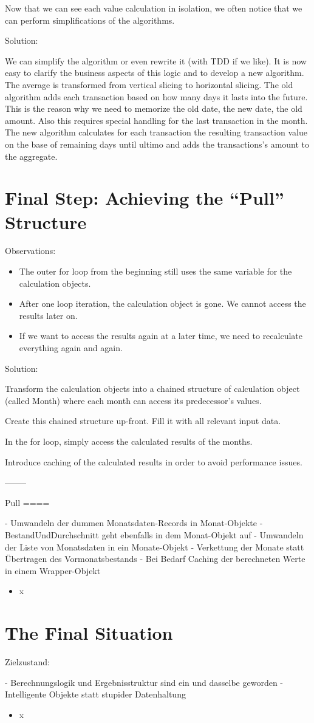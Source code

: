\documentclass[a4paper,fleqn,titlepage,11pt]{article}
\begin{document}
Now that we can see each value calculation in isolation, we often notice that we can perform simplifications of the algorithms. 

Solution:

We can simplify the algorithm or even rewrite it (with TDD if we like). It is now easy to clarify the business aspects of this logic and to develop a new algorithm. The average is transformed from vertical slicing to horizontal slicing. The old algorithm adds each transaction based on how many days it lasts into the future. This is the reason why we need to memorize the old date, the new date, the old amount. Also this requires special handling for the last transaction in the month. The new algorithm calculates for each transaction the resulting transaction value on the base of remaining days until ultimo and adds the transactions's amount to the aggregate.

\section*{Final Step: Achieving the ``Pull'' Structure}

Observations:

\begin{itemize}
\item The outer for loop from the beginning still uses the same variable for the calculation objects.
\item After one loop iteration, the calculation object is gone. We cannot access the results later on.
\item If we want to access the results again at a later time, we need to recalculate everything again and again.
\end{itemize}

Solution:

Transform the calculation objects into a chained structure of calculation object (called Month) where each month can access its predecessor's values.

Create this chained structure up-front. Fill it with all relevant input data.

In the for loop, simply access the calculated results of the months.

Introduce caching of the calculated results in order to avoid performance issues.

--------

Pull
====

- Umwandeln der dummen Monatsdaten-Records in Monat-Objekte
- BestandUndDurchschnitt geht ebenfalls in dem Monat-Objekt auf
- Umwandeln der Liste von Monatsdaten in ein Monate-Objekt
- Verkettung der Monate statt Übertragen des Vormonatsbestands
- Bei Bedarf Caching der berechneten Werte in einem Wrapper-Objekt

\begin{itemize}
\item x
\end{itemize}

\section{The Final Situation}

Zielzustand:

- Berechnungslogik und Ergebnisstruktur sind ein und dasselbe geworden
- Intelligente Objekte statt stupider Datenhaltung

\begin{itemize}
\item x
\end{itemize}
\end{document}
